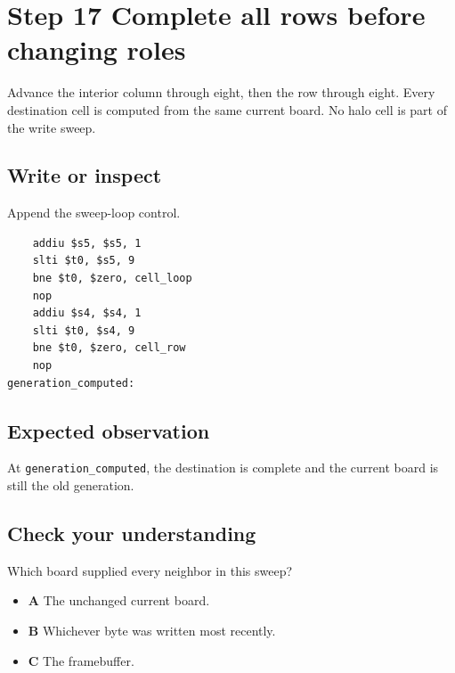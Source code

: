 \section{Step 17 Complete all rows before changing
  roles}\label{008-life-generations-s17-step-17-complete-all-rows-before-changing-roles}

Advance the interior column through eight, then the row through eight.
Every destination cell is computed from the same current board. No halo
cell is part of the write sweep.

\subsection{Write or
  inspect}\label{008-life-generations-s17-write-or-inspect}

Append the sweep-loop control.

\begin{verbatim}
    addiu $s5, $s5, 1
    slti $t0, $s5, 9
    bne $t0, $zero, cell_loop
    nop
    addiu $s4, $s4, 1
    slti $t0, $s4, 9
    bne $t0, $zero, cell_row
    nop
generation_computed:
\end{verbatim}

\subsection{Expected
  observation}\label{008-life-generations-s17-expected-observation}

At \texttt{generation\_computed}, the destination is complete and the
current board is still the old generation.

\subsection{Check your
  understanding}\label{008-life-generations-s17-check-your-understanding}

Which board supplied every neighbor in this sweep?

\begin{itemize}
  \tightlist
  \item
        \textbf{A} The unchanged current board.
  \item
        \textbf{B} Whichever byte was written most recently.
  \item
        \textbf{C} The framebuffer.
\end{itemize}
